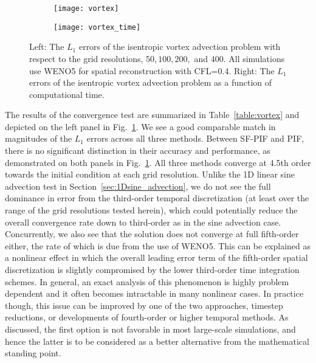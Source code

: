 \documentclass[times,preprint,3p]{elsarticle}
\begin{document}
\begin{figure}[ht!]
    \centering
    \begin{subfigure}{80mm}
        \centering
        \texttt{[image: vortex]}
    \end{subfigure}
    \begin{subfigure}{80mm}
        \centering
        \texttt{[image: vortex\_time]}
    \end{subfigure}
    \caption{Left: The \( L_{1} \) errors of the isentropic vortex advection problem
        with respect to the grid resolutions, \( 50, 100, 200, \) and \( 400 \).
        All simulations use WENO5 for spatial reconstruction with CFL=0.4.
        Right: The \( L_{1} \) errors of the isentropic vortex advection problem
       as a function of computational time.
    }\label{fig:vortex}
\end{figure}


The results of the convergence test are summarized in Table~\ref{table:vortex}
and depicted on the left panel in Fig.~\ref{fig:vortex}.
We see a good comparable match in magnitudes of the $L_1$ errors
across all three methods.
Between SF-PIF and PIF, there is
no significant distinction in their accuracy and performance, as demonstrated
on both panels
in Fig.~\ref{fig:vortex}. All three methods converge at
4.5th order towards the initial condition at each grid resolution.
Unlike the 1D linear sine advection test in Section~\ref{sec:1Dsine_advection},
we do not see the full dominance in error from the third-order temporal discretization
(at least over the range of the grid resolutions tested herein),
which could potentially reduce the overall convergence rate down
to third-order as in the sine advection case.
Concurrently, we also see that the solution does not converge at
full fifth-order either, the rate of which is due from the use of WENO5.
This can be explained as a nonlinear effect in which
the overall leading error term of the fifth-order spatial discretization
is slightly compromised by the lower third-order time integration schemes.
In general, an exact analysis of this phenomenon is highly problem dependent
and it often becomes intractable in many nonlinear cases.
In practice though, this issue can be improved by one of the two approaches,
timestep reductions, or developments of fourth-order or higher temporal methods.
As discussed, the first option is not favorable in most large-scale simulations, and hence
the latter is to be considered as a better alternative from
the mathematical standing point.
\end{document}
